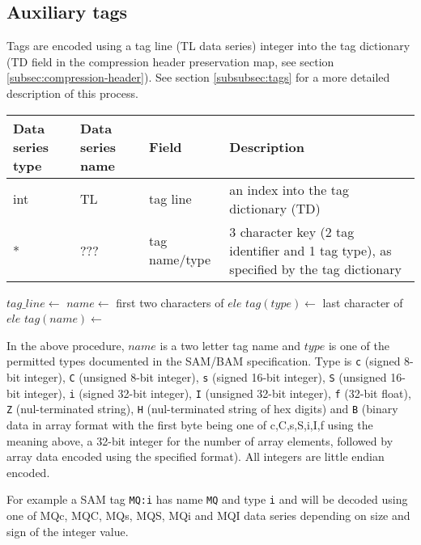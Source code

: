 \documentclass[a4paper]{article}
\begin{document}
\subsection{Auxiliary tags}
\label{subsec:tags}

Tags are encoded using a tag line (TL data series) integer into the tag dictionary (TD field in the compression header preservation map, see section \ref{subsec:compression-header}).
See section \ref{subsubsec:tags} for a more detailed description of this process.

\begin{tabular}{|>{\raggedright}p{70pt}|>{\raggedright}p{75pt}|>{\raggedright}p{90pt}|>{\raggedright}p{200pt}|}
\hline
\textbf{Data series type} & \textbf{Data series name} & \textbf{Field} & \textbf{Description}\tabularnewline
\hline
int & TL & tag line & an index into the tag dictionary (TD)\tabularnewline
\hline
* & ??? & tag name/type & 3 character key (2 tag identifier and 1 tag type), as specified by the tag dictionary\tabularnewline
\hline
\end{tabular}

\vskip 20pt
\begin{algorithmic}[1]
\State $tag\_line\gets$ 
  \State $name\gets$ first two characters of $ele$
  \State $tag(type)\gets$ last character of $ele$
  \State $tag(name)\gets$ 
\EndFor
\EndProcedure
\end{algorithmic}

In the above procedure, $name$ is a two letter tag name and $type$ is one of the permitted types documented in the SAM/BAM specification.
Type is \texttt{c} (signed 8-bit integer), \texttt{C} (unsigned 8-bit integer), \texttt{s} (signed 16-bit integer), \texttt{S} (unsigned 16-bit integer), \texttt{i} (signed 32-bit integer), \texttt{I} (unsigned 32-bit integer), \texttt{f} (32-bit float), \texttt{Z} (nul-terminated string), \texttt{H} (nul-terminated string of hex digits) and \texttt{B} (binary data in array format with the first byte being one of c,C,s,S,i,I,f using the meaning above, a 32-bit integer for the number of array elements, followed by array data encoded using the specified format).  All integers are little endian encoded.

For example a SAM tag \texttt{MQ:i} has name \texttt{MQ} and type \texttt{i} and will be decoded using one of MQc, MQC, MQs, MQS, MQi and MQI data series depending on size and sign of the integer value.
\end{document}
